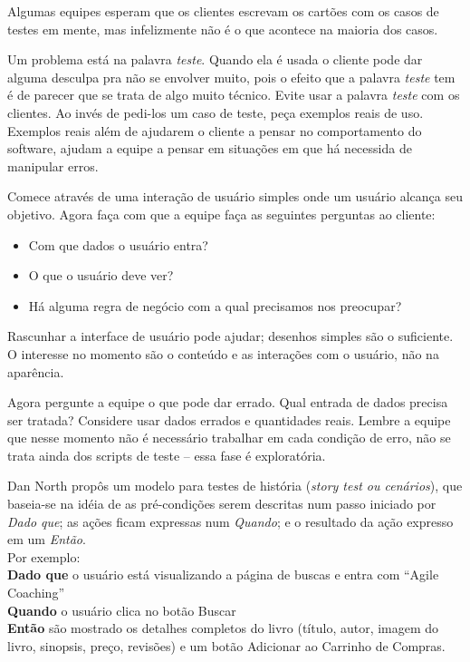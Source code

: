 \documentclass[a4paper, 10pt, font=plain]{abnt}
\begin{document}
Algumas equipes esperam que os clientes escrevam os cartões com os casos de testes em mente, mas infelizmente não é o que acontece na maioria dos casos.

Um problema está na palavra \textit{teste}. Quando ela é usada o cliente pode dar alguma desculpa pra não se envolver muito, pois o efeito que a palavra \textit{teste} tem é de parecer que se trata de algo muito técnico. Evite usar a palavra \textit{teste} com os clientes. Ao invés de pedi-los um caso de teste, peça exemplos reais de uso. Exemplos reais além de ajudarem o cliente a pensar no comportamento do software, ajudam a equipe a pensar em situações em que há necessida de manipular erros.

Comece através de uma interação de usuário simples onde um usuário alcança seu objetivo. Agora faça com que a equipe faça as seguintes perguntas ao cliente:

\begin{itemize}
\item Com que dados o usuário entra?
\item O que o usuário deve ver?
\item Há alguma regra de negócio com a qual precisamos nos preocupar?
\end{itemize}

Rascunhar a interface de usuário pode ajudar; desenhos simples são o suficiente. O interesse no momento são o conteúdo e as interações com o usuário, não na aparência.

Agora pergunte a equipe o que pode dar errado. Qual entrada de dados precisa ser tratada? Considere usar dados errados e quantidades reais. Lembre a equipe que nesse momento não é necessário trabalhar em cada condição de erro, não se trata ainda dos scripts de teste -- essa fase é exploratória.

Dan North propôs um modelo para testes de história (\textit{story test ou cenários}), que baseia-se na idéia de as pré-condições serem descritas num passo iniciado por \textit{Dado que}; as ações ficam expressas num \textit{Quando}; e o resultado da ação expresso em um \textit{Então}.\\
Por exemplo:\\
\textbf{Dado que} o usuário está visualizando a página de buscas e entra com ``Agile Coaching''\\
\textbf{Quando} o usuário clica no botão Buscar\\
\textbf{Então} são mostrado os detalhes completos do livro (título, autor, imagem do livro, sinopsis, preço, revisões) e um botão Adicionar ao Carrinho de Compras.
\end{document}
